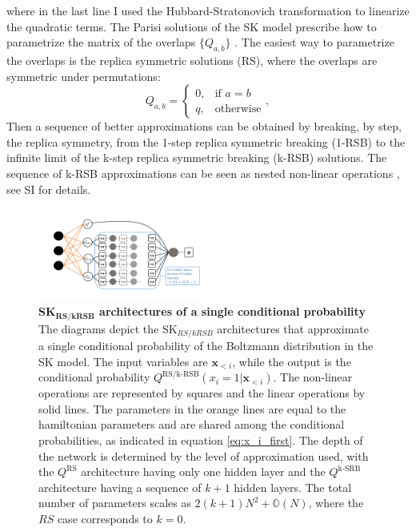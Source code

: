 \documentclass[aps,physrev,10pt,floatfix,reprint]{revtex4-2}
\begin{document}
where in the last line I used the Hubbard-Stratonovich transformation to linearize the quadratic terms. 
The Parisi solutions of the SK model prescribe how to parametrize the matrix of the overlaps $\{Q_{a,b}\}$ \cite{10.1142/0271}. The easiest way to parametrize the overlaps is the replica symmetric solutions (RS), where the overlaps are symmetric under permutations: 
$$
Q_{a,b}=\begin{cases}
			0, & \text{if $a=b$}\\
            q, & \text{otherwise}
		 \end{cases},
$$
Then a sequence of better approximations can be obtained by breaking, by step, the replica symmetry, from the 1-step replica symmetric breaking (1-RSB) to the infinite limit of the k-step replica symmetric breaking (k-RSB) solutions. 
The sequence of k-RSB approximations can be seen as nested non-linear operations \cite{Parisi_1980}, see SI for details. 
\begin{figure}[!h]
    \centering 
    \includegraphics[width=0.48\textwidth]{img/SK_arch.pdf}
    \caption{\textbf{SK$\mathbf{_{RS/kRSB}}$ architectures of a single conditional probability} The diagrams depict the SK$_{RS/kRSB}$ architectures that approximate a single conditional probability of the Boltzmann distribution in the SK model. The input variables are $\mathbf{x}_{<i}$, while the output is the conditional probability $Q^{\text{RS/k-RSB}}\left(x_{i}=1|\mathbf{x}_{<i}\right)$. The non-linear operations are represented by squares and the linear operations by solid lines. The parameters in the orange lines are equal to the hamiltonian parameters and are shared among the conditional probabilities, as indicated in equation \ref{eq:x_i_first}. The depth of the network is determined by the level of approximation used, with the $Q^{\text{RS}}$ architecture having only one hidden layer and the $Q^{\text{k-SRB}}$ architecture having a sequence of $k+1$ hidden layers. The total number of parameters scales as $2(k+1)N^2 + \mathbb{O}(N)$, where the $RS$ case corresponds to $k=0$.}
    \label{fig:SK_arch}
\end{figure}
\end{document}
